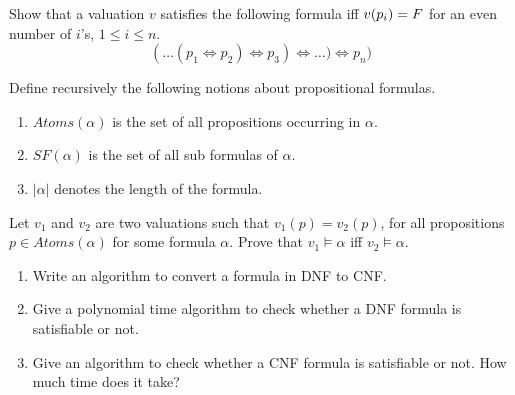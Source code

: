 \begin{exercise}
Show that a valuation $v$ satisfies the following formula iff $v(p_i) = F$ for an even number of $i$'s, $1 \leq i \leq n$.
\[ 
(\dots(p_1 \iff p_2)\iff p_3)\iff \dots)\iff p_n)
\]
\end{exercise}

\begin{exercise}
Define recursively the following notions about propositional formulas. 
\begin{enumerate}
\item $Atoms(\alpha)$ is the set of all propositions occurring in $\alpha$.
\item $SF(\alpha)$ is the set of all sub formulas of $\alpha$.
\item $|\alpha|$ denotes the length of the formula.
\end{enumerate}
\end{exercise}


\begin{exercise}  
Let $v_1$ and $v_2$ are two valuations such that $v_1(p) = v_2(p)$, for all propositions $p \in Atoms(\alpha)$ for some formula $\alpha$. Prove that $v_1 \models \alpha$ iff $v_2 \models \alpha$.
\end{exercise}

\begin{exercise}
\begin{enumerate}
\item Write an algorithm to convert a formula in DNF to CNF.
\item Give a polynomial time algorithm to check whether a DNF formula is satisfiable or not.
\item Give an algorithm to check whether a CNF formula is satisfiable or not. How much time does it take?
\end{enumerate}
\end{exercise}

